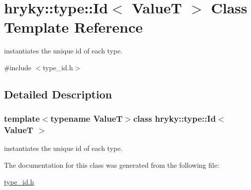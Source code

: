 \hypertarget{classhryky_1_1type_1_1_id}{\section{hryky\-:\-:type\-:\-:Id$<$ Value\-T $>$ Class Template Reference}
\label{classhryky_1_1type_1_1_id}
}


instantiates the unique id of each type.  




{\ttfamily \#include $<$type\-\_\-id.\-h$>$}



\subsection{Detailed Description}
\subsubsection*{template$<$typename Value\-T$>$class hryky\-::type\-::\-Id$<$ Value\-T $>$}

instantiates the unique id of each type. 

The documentation for this class was generated from the following file\-:\begin{DoxyCompactItemize}
\item 
\hyperlink{type__id_8h}{type\-\_\-id.\-h}\end{DoxyCompactItemize}
